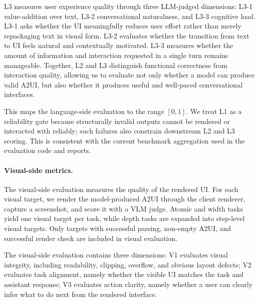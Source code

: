 L3 measures user experience quality through three LLM-judged dimensions: L3-1 value-addition over text, L3-2 conversational naturalness, and L3-3 cognitive load. L3-1 asks whether the UI meaningfully reduces user effort rather than merely repackaging text in visual form. L3-2 evaluates whether the transition from text to UI feels natural and contextually motivated. L3-3 measures whether the amount of information and interaction requested in a single turn remains manageable. Together, L2 and L3 distinguish functional correctness from interaction quality, allowing us to evaluate not only whether a model can produce valid A2UI, but also whether it produces useful and well-paced conversational interfaces.


This maps the language-side evaluation to the range $[0,1]$. We treat L1 as a reliability gate because structurally invalid outputs cannot be rendered or interacted with reliably; such failures also constrain downstream L2 and L3 scoring. This is consistent with the current benchmark aggregation used in the evaluation code and reports.

\paragraph{Visual-side metrics.}
The visual-side evaluation measures the quality of the rendered UI. For each visual target, we render the model-produced A2UI through the client renderer, capture a screenshot, and score it with a VLM judge. Atomic and width tasks yield one visual target per task, while depth tasks are expanded into step-level visual targets. Only targets with successful parsing, non-empty A2UI, and successful render check are included in visual evaluation.

The visual-side evaluation contains three dimensions:
V1 evaluates visual integrity, including readability, clipping, overflow, and obvious layout defects;
V2 evaluates task alignment, namely whether the visible UI matches the task and assistant response;
V3 evaluates action clarity, namely whether a user can clearly infer what to do next from the rendered interface.
